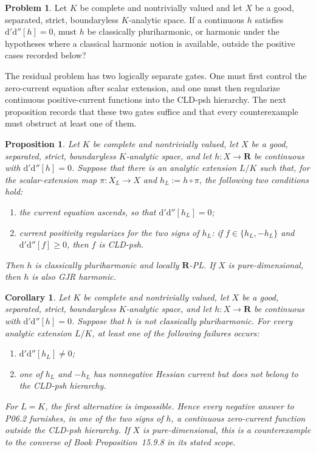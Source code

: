 \documentclass[11pt,a4paper]{article}
\newtheorem{proposition}[proposition]{Proposition}
\newtheorem{corollary}[corollary]{Corollary}
\theoremstyle{definition}
\newtheorem{problem}{Problem}[section]
\theoremstyle{remark}
\newcommand{\rd}{\mathrm d}
\newcommand{\dprime}{\rd'}
\newcommand{\ddprime}{\rd''}
\newcommand{\dprimeddprime}{\dprime\ddprime}
\begin{document}
\begin{problem}\label{prob:frontier-pluriharmonic}
Let $K$ be complete and nontrivially valued and let $X$ be a good,
separated, strict, boundaryless $K$-analytic space. If a continuous $h$
satisfies $\dprimeddprime[h]=0$, must $h$ be classically pluriharmonic,
or harmonic under the hypotheses where a classical harmonic notion is
available, outside the positive cases recorded below?
\end{problem}

The residual problem has two logically separate gates.  One must first
control the zero-current equation after scalar extension, and one must then
regularize continuous positive-current functions into the CLD-psh
hierarchy.  The next proposition records that these two gates suffice and
that every counterexample must obstruct at least one of them.

\medskip


\begin{proposition}
\label{prop:p062-scalar-regularization-two-gate}
Let $K$ be complete and nontrivially valued, let $X$ be a good,
separated, strict, boundaryless $K$-analytic space, and let
$h\colon X\to\mathbf R$ be continuous with
$\dprimeddprime[h]=0$.  Suppose that there is an analytic extension
$L/K$ such that, for the scalar-extension map
$\pi\colon X_L\to X$ and $h_L:=h\circ\pi$, the following two conditions
hold:
\begin{enumerate}
\item the current equation ascends, so that
$\dprimeddprime[h_L]=0$;
\item current positivity regularizes for the two signs of $h_L$: if
$f\in\{h_L,-h_L\}$ and $\dprimeddprime[f]\geq0$, then $f$ is CLD-psh.
\end{enumerate}
Then $h$ is classically pluriharmonic and locally $\mathbf R$-PL.  If $X$
is pure-dimensional, then $h$ is also GJR harmonic.
\end{proposition}

\begin{corollary}
\label{cor:p062-counterexample-two-gate-obstruction}
Let $K$ be complete and nontrivially valued, let $X$ be a good, separated,
strict, boundaryless $K$-analytic space, and let
$h\colon X\to\mathbf R$ be continuous with $\dprimeddprime[h]=0$.
Suppose that $h$ is not classically pluriharmonic.  For every analytic
extension $L/K$, at least one of the following failures occurs:
\begin{enumerate}
\item $\dprimeddprime[h_L]\neq0$;
\item one of $h_L$ and $-h_L$ has nonnegative Hessian current but does
not belong to the CLD-psh hierarchy.
\end{enumerate}
For $L=K$, the first alternative is impossible.  Hence every negative
answer to P06.2 furnishes, in one of the two signs of $h$, a continuous
zero-current function outside the CLD-psh hierarchy.  If $X$ is
pure-dimensional, this is a counterexample to the converse of
Book Proposition~15.9.8 in its stated scope.
\end{corollary}
\end{document}
